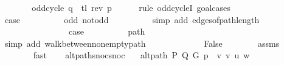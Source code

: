 \begin{isabellebody}
\ \ \ \ \isamarkupfalse%
\ \isamarkupfalse%
\ {\isachardoublequoteopen}odd{\isacharunderscore}{\kern0pt}cycle\ {\isacharparenleft}{\kern0pt}q\ {\isacharat}{\kern0pt}\ tl\ {\isacharparenleft}{\kern0pt}rev\ p{\isacharparenright}{\kern0pt}{\isacharparenright}{\kern0pt}{\isachardoublequoteclose}\isanewline
\ \ \ \ \isamarkupfalse%
\ {\isacharparenleft}{\kern0pt}rule\ odd{\isacharunderscore}{\kern0pt}cycleI{\isacharcomma}{\kern0pt}\ goal{\isacharunderscore}{\kern0pt}cases{\isacharparenright}{\kern0pt}\isanewline
\ \ \ \ \ \ \isamarkupfalse%
\ {}\isanewline
\ \ \ \ \ \ \isamarkupfalse%
\ {\isacharquery}{\kern0pt}case\isanewline
\ \ \ \ \ \ \ \ \isamarkupfalse%
\ odd\ not{\isacharunderscore}{\kern0pt}odd\isanewline
\ \ \ \ \ \ \ \ \isamarkupfalse%
\ {\isacharparenleft}{\kern0pt}simp\ add{\isacharcolon}{\kern0pt}\ edges{\isacharunderscore}{\kern0pt}of{\isacharunderscore}{\kern0pt}path{\isacharunderscore}{\kern0pt}length{\isacharparenright}{\kern0pt}\isanewline
\ \ \ \ \isamarkupfalse%
\isanewline
\ \ \ \ \ \ \isamarkupfalse%
\ {}\isanewline
\ \ \ \ \ \ \isamarkupfalse%
\ {\isacharquery}{\kern0pt}case\isanewline
\ \ \ \ \ \ \ \ \isamarkupfalse%
\ path\isanewline
\ \ \ \ \ \ \ \ \isamarkupfalse%
\ {\isacharparenleft}{\kern0pt}simp\ add{\isacharcolon}{\kern0pt}\ walk{\isacharunderscore}{\kern0pt}between{\isacharunderscore}{\kern0pt}nonempty{\isacharunderscore}{\kern0pt}path{\isacharparenleft}{\kern0pt}{}{\isacharcomma}{\kern0pt}\ {}{\isacharparenright}{\kern0pt}{\isacharparenright}{\kern0pt}\isanewline
\ \ \ \ \isamarkupfalse%
\isanewline
\ \ \ \ \isamarkupfalse%
\ \isamarkupfalse%
\ False\isanewline
\ \ \ \ \ \ \isamarkupfalse%
\ assms{\isacharparenleft}{\kern0pt}{}{\isacharparenright}{\kern0pt}\isanewline
\ \ \ \ \ \ \isamarkupfalse%
\ fast\isanewline
\ \ \isamarkupfalse%
\isanewline
{}\isamarkupfalse%
%
\endisatagproof
{\isafoldproof}%
%
\isadelimproof
\isanewline
%
\endisadelimproof
%
\isadeliminvisible
\isanewline
%
\endisadeliminvisible
%
\isataginvisible
{}\isamarkupfalse%
\ alt{\isacharunderscore}{\kern0pt}path{\isacharunderscore}{\kern0pt}snoc{\isacharunderscore}{\kern0pt}snoc{\isacharcolon}{\kern0pt}\isanewline
\ \ \ {\isachardoublequoteopen}alt{\isacharunderscore}{\kern0pt}path\ P\ Q\ G\ {\isacharparenleft}{\kern0pt}p\ {\isacharat}{\kern0pt}\ {\isacharbrackleft}{\kern0pt}v{\isacharcomma}{\kern0pt}\ v{\isacharprime}{\kern0pt}{\isacharbrackright}{\kern0pt}{\isacharparenright}{\kern0pt}\ u\ w{\isachardoublequoteclose}\isanewline

\end{isabellebody}
